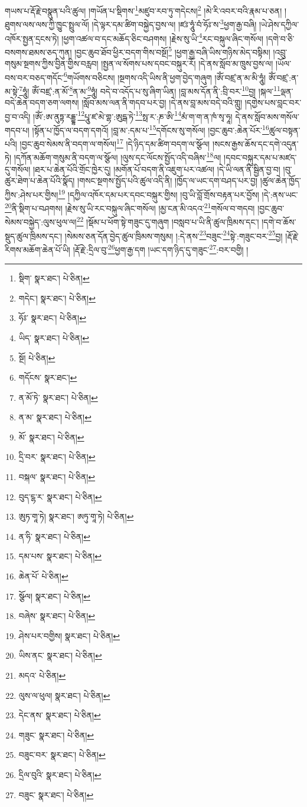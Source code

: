 གཡས་པ་རྡོ་རྗེ་བསྣུན་པའི་ཚུལ། །གཡོན་པ་སྡིགས་\footnote{སྡིག་  སྣར་ཐང་།  པེ་ཅིན། }མཛུབ་རབ་ཏུ་གདེངས།\footnote{གདེང་།  སྣར་ཐང་།  པེ་ཅིན། } །མེ་རི་འབར་བའི་རྣམ་པ་ཅན། །ཐུགས་ལས་ལས་ཀྱི་ཁྱུང་སྤྲུལ་ལོ། །དེ་ལྟར་དམ་ཚིག་བསྐྱེད་བྱས་ལ། །ཛཿ་ཧཱུཾ་བཾ་ཧོཿ་ས་\footnote{ཧོཿ་  སྣར་ཐང་།  པེ་ཅིན། }ཕྱག་རྒྱ་བཞི། །ཡེ་ཤེས་དཀྱིལ་འཁོར་སྤྱན་དྲངས་ཏེ། །ཕྱག་འཚལ་བ་དང་མཆོད་ཅིང་བཤགས། །རྗེས་སུ་ཡི་\footnote{ཡིད་  སྣར་ཐང་།  པེ་ཅིན། }རང་བསྐུལ་ཞིང་གསོལ། །དགེ་བ་ཅི་བསགས་ཐམས་ཅད་ཀུན། །བྱང་ཆུབ་ཐོབ་ཕྱིར་བདག་གིས་བསྔོ།\footnote{སྔོ།  པེ་ཅིན། } །ཕྱག་རྒྱ་བཞི་ཡིས་གཉིས་མེད་བསྟིམ། །འབྲུ་གསུམ་སྔགས་ཀྱིས་བྱིན་གྱིས་བརླབ། །སྤྱན་ལ་སོགས་པས་དབང་བསྐུར་རོ། །དེ་ནས་སློབ་མ་ཁྲུས་བྱས་ལ། །ཡོལ་བས་བར་བཅད་གདོང་\footnote{གདོངས་  སྣར་ཐང་། }གཡོགས་བཅིངས། །སྔགས་འདི་ཡིས་ནི་ཕྱག་བྱེད་གཞུག །ཨོཾ་བཛྲ་ན་མ་མི་ཧཱུཾ། ཨོཾ་བཛྲ་:ན་མ་སྟེ་\footnote{ན་མོ་ཏེ་  སྣར་ཐང་།  པེ་ཅིན། }ཧཱུཾ། ཨོཾ་བཛྲ་:ན་མོ་\footnote{ན་མ་  སྣར་ཐང་།  པེ་ཅིན། }ན་མ་\footnote{མོ་  སྣར་ཐང་།  པེ་ཅིན། }ཧཱུཾ། བདེ་བ་འདོད་པ་སུ་ཞིག་ཡིན། །བླ་མས་དོན་ནི་:བྲི་བར་\footnote{དྲི་བར་  སྣར་ཐང་།  པེ་ཅིན། }བྱ། །སྐལ་\footnote{བསྐལ་  སྣར་ཐང་།  པེ་ཅིན། }ལྡན་བདེ་ཆེན་བདག་ཅག་ལགས། །སློབ་མས་ལན་ནི་གདབ་པར་བྱ། །དེ་ནས་བླ་མས་བདེ་བའི་གླུ། །དགྱེས་པས་བླང་བར་བྱ་བ་འདི། །ཨོཾ་:ཨ་ནུཏྟ་རདྡྷ་\footnote{བུད་ངྷ་ར་  སྣར་ཐང་།  པེ་ཅིན། }པཱུ་ཛ་མེ་གྷ་:ཨུདྒ་ཏེ་\footnote{ཨུཏ་གཱ་ཏེ།   སྣར་ཐང་། ཨཏུ་གཱ་ཏེ།   པེ་ཅིན། }སྥ་ར་:ཎ་ཨི་\footnote{ན་ཧི་  སྣར་ཐང་།  པེ་ཅིན། }མཾ་ག་ག་ན་ཁཾ་སྭ་ཧཱ། དེ་ནས་སློབ་མས་གསོལ་གདབ་པ། །སྟོན་པ་ཁྱོད་ལ་བདག་དགའོ། །བླ་མ་:དམ་པ་\footnote{དམ་པས་  སྣར་ཐང་།  པེ་ཅིན། }དགོངས་སུ་གསོལ། །བྱང་ཆུབ་:ཆེན་པོར་\footnote{ཆེན་པོ་  པེ་ཅིན། }ཚུལ་བསྟན་པའི། །བྱང་ཆུབ་སེམས་ནི་བདག་ལ་གསོལ།\footnote{སྩོལ།  སྣར་ཐང་།  པེ་ཅིན། } །དེ་ཉིད་དམ་ཚིག་བདག་ལ་སྩོལ། །སངས་རྒྱས་ཆོས་དང་དགེ་འདུན་ཏེ། །དཀོན་མཆོག་གསུམ་ནི་བདག་ལ་སྩོལ། །ལུས་དང་ལོངས་སྤྱོད་འདི་བཞིས་\footnote{བཞེས་  སྣར་ཐང་།  པེ་ཅིན། }ལ། །དབང་བསྐུར་དམ་པ་མཛད་དུ་གསོལ། །ཐར་པ་ཆེན་པོའི་གྲོང་ཁྱེར་དུ། །མགོན་པོ་བདག་ནི་འཇུག་པར་འཚལ། །དེ་ཡི་ལན་ནི་སྦྱིན་བྱ་བ། །བུ་ཚུར་ཐེག་པ་ཆེན་པོའི་སྣོད། །གསང་སྔགས་སྤྱོད་པའི་ཚུལ་འདི་ནི། །ཁྱོད་ལ་ཡང་དག་བཤད་པར་བྱ། །ཚུལ་ཆེན་ཁྱོད་ཀྱིས་:ཤེས་པར་གྱིས།\footnote{ཤེས་པར་བགྱིས།  སྣར་ཐང་།  པེ་ཅིན། } །དཀྱིལ་འཁོར་དམ་པར་དབང་བསྐུར་གྱིས། །བུ་ཡི་བློ་གྲོས་བརྟན་པར་བྱོས། །དེ་:ནས་ཡང་\footnote{ཡིས་ནང་  སྣར་ཐང་།  པེ་ཅིན། }ནི་སྡིག་པ་བཤགས། །རྗེས་སུ་ཡི་རང་བསྐུལ་ཞིང་གསོལ། །མྱ་ངན་མི་འདའ་\footnote{མདའ་  པེ་ཅིན། }གསོལ་བ་གདབ། །བྱང་ཆུབ་སེམས་བསྐྱེད་:ལུས་ཕུལ་ལ།\footnote{ལུས་ལ་ཕུལ།  སྣར་ཐང་།  པེ་ཅིན། } །སྡོམ་པ་ཕོག་སྟེ་གཟུང་དུ་གཞུག །བསླབ་པ་ཡི་ནི་ཚུལ་ཁྲིམས་དང་། །དགེ་བ་ཆོས་སྡུད་ཚུལ་ཁྲིམས་དང་། །སེམས་ཅན་དོན་བྱེད་ཚུལ་ཁྲིམས་གསུམ། །:དེ་ནས་\footnote{དེང་ནས་  སྣར་ཐང་།  པེ་ཅིན། }བཟུང་\footnote{གཟུང་  སྣར་ཐང་།  པེ་ཅིན། }སྟེ་:གཟུང་བར་\footnote{བཟུང་བར་  སྣར་ཐང་།  པེ་ཅིན། }བྱ། །རྡོ་རྗེ་རིགས་མཆོག་ཆེན་པོ་ཡི། །རྡོ་རྗེ་:དྲིལ་བུ་\footnote{དྲིལ་བུའི་  སྣར་ཐང་།  པེ་ཅིན། }ཕྱག་རྒྱ་དག །ཡང་དག་ཉིད་དུ་གཟུང་\footnote{བཟུང་  སྣར་ཐང་།  པེ་ཅིན། }:བར་བགྱི། །
